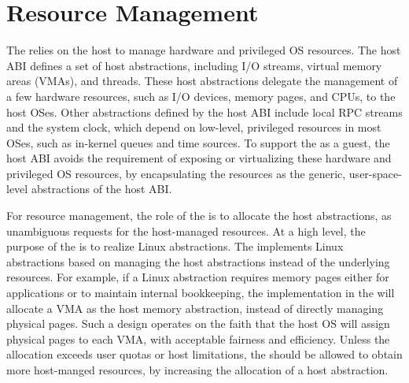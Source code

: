 \section{Resource Management}
\label{sec:libos:resource}


The \libos{}
relies on the host to manage hardware and privileged OS resources.
The host ABI
defines a set of host abstractions,
including I/O streams, virtual memory areas (VMAs), and threads.
These host abstractions delegate
the management of a few hardware resources, such as I/O devices, memory pages, and CPUs,
to the host OSes.
Other abstractions defined
by the host ABI
include local RPC streams and the system clock,
which depend on low-level, privileged resources in most OSes,
such as in-kernel queues and time sources.
To support the \libos{} as a guest,
the host ABI avoids the requirement of exposing or virtualizing %
these hardware and privileged OS resources,
by encapsulating the resources as the generic, user-space-level abstractions
of the host ABI.



For resource management, the role of the \libos{}
is to allocate the host abstractions,
as unambiguous requests %
for the host-managed resources.
At a high level, the purpose of the \libos{} is to realize Linux abstractions.
The \libos{} implements Linux abstractions
based on managing the host abstractions instead of
the underlying resources.
For example, if a Linux abstraction requires memory pages
either for applications or
to maintain internal bookkeeping,
the implementation in
the \libos{} will allocate a VMA as the host memory abstraction, instead of directly managing physical pages.
Such a \libos{} design operates on the faith that the host OS will assign physical pages to each VMA, with acceptable fairness and efficiency.
Unless the allocation exceeds user quotas or host limitations,
the \libos{} should be allowed to obtain more host-manged resources,
by increasing the allocation of a host abstraction.
















